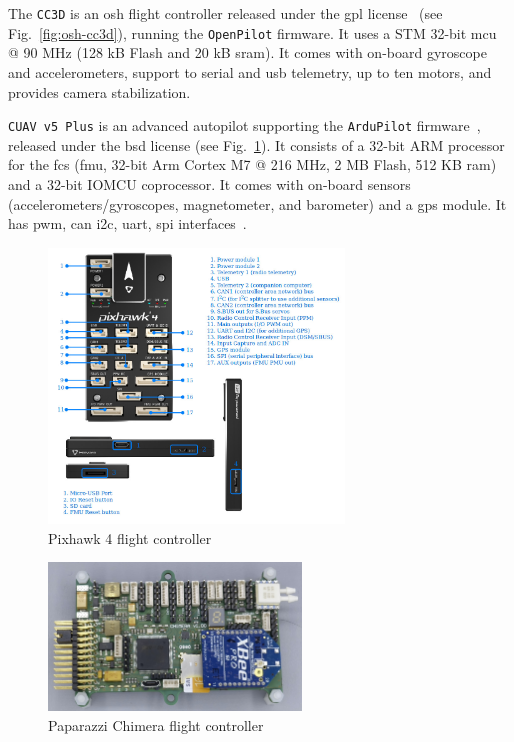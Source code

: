   The \texttt{CC3D} is an \gls{osh} flight controller released
  under the \gls{gpl} license~\cite{cc3d} (see
  Fig.~\ref{fig:osh-cc3d}), running the \texttt{OpenPilot} firmware. It uses a STM 32-bit \gls{mcu} @ 90
  MHz (128 kB Flash and 20 kB \gls{sram}). It comes with on-board gyroscope and
  accelerometers, support to serial and \gls{usb} telemetry, up to ten motors,
  and provides camera stabilization.
  
  \texttt{CUAV v5 Plus} is an advanced autopilot supporting the
  \texttt{ArduPilot} firmware~\cite{arduPilot-cuavV5}, released under the \gls{bsd} license (see Fig.~\ref{fig:osh-pixhawk4}). It consists of a 32-bit ARM processor
  for the \gls{fcs} (\gls{fmu}, 32-bit Arm Cortex M7 @ 216 MHz, 2 MB Flash, 512
  KB \gls{ram}) and a 32-bit IOMCU coprocessor. It comes with on-board sensors
  (accelerometers/gyroscopes, magnetometer, and barometer) and a \gls{gps}
  module. It has \gls{pwm}, \gls{can} \gls{i2c}, \gls{uart}, \gls{spi} interfaces~\cite{arduPilot-cuavV5}.

\begin{figure}[!hbt]
  \centering
  \includegraphics[width=0.7\textwidth]{./img/jpg/osh-pixhawk4.jpg} 
  \caption{Pixhawk 4 flight controller~\cite{pixhawk4}}%
  \label{fig:osh-pixhawk4}
\end{figure}

\begin{figure}[!hbt]
  \centering
  \includegraphics[width=0.6\textwidth]{./img/png/osh-paparazzi-chimera.png} 
  \caption{Paparazzi Chimera flight controller~\cite{paparazziChimera}}%
  \label{fig:osh-paparazzi-chimera}
\end{figure}

